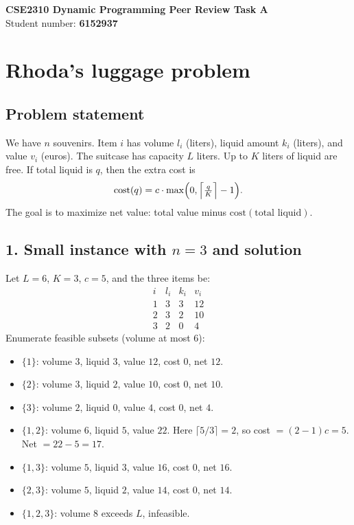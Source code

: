 \documentclass[a4paper,11pt]{article}
\begin{document}
	\begin{center}
		{\Large \textbf{CSE2310 Dynamic Programming Peer Review Task A}}\\[4pt]
		Student number: \textbf{6152937}
	\end{center}

	\vspace{1em}

	\section{Rhoda's luggage problem}

	\subsection{Problem statement}
	We have $n$ souvenirs. Item $i$ has volume $l_i$ (liters), liquid amount $k_i$ (liters), and value $v_i$ (euros).
	The suitcase has capacity $L$ liters. Up to $K$ liters of liquid are free. If total liquid is $q$, then the extra cost is
	\[
	\mathrm{cost}(q) = c \cdot \max\Bigl(0,\Bigl\lceil \tfrac{q}{K}\Bigr\rceil - 1\Bigr).
	\]
	The goal is to maximize net value: total value minus
	$\mathrm{cost}(\text{total liquid})$.

	\subsection{1. Small instance with $n=3$ and solution}
	Let $L=6$, $K=3$, $c=5$, and the three items be:
	\[
	\begin{array}{c|ccc}
		i & l_i & k_i & v_i\\ \hline
		1 & 3 & 3 & 12\\
		2 & 3 & 2 & 10\\
		3 & 2 & 0 & 4
	\end{array}
	\]
	Enumerate feasible subsets (volume at most $6$):

	\begin{itemize}[leftmargin=2em]
		\item $\{1\}$: volume $3$, liquid $3$, value $12$, cost $0$, net $12$.
		\item $\{2\}$: volume $3$, liquid $2$, value $10$, cost $0$, net $10$.
		\item $\{3\}$: volume $2$, liquid $0$, value $4$, cost $0$, net $4$.
		\item $\{1,2\}$: volume $6$, liquid $5$, value $22$.
		Here $\lceil 5/3\rceil = 2$, so cost $= (2-1)c = 5$. Net $=22-5=17$.
		\item $\{1,3\}$: volume $5$, liquid $3$, value $16$, cost $0$, net $16$.
		\item $\{2,3\}$: volume $5$, liquid $2$, value $14$, cost $0$, net $14$.
		\item $\{1,2,3\}$: volume $8$ exceeds $L$, infeasible.
	\end{itemize}
\end{document}
